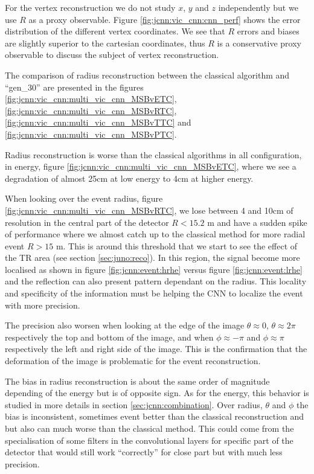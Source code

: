 For the vertex reconstruction we do not study $x$, $y$ and $z$ independently but we use $R$ as a proxy observable. Figure \ref{fig:jcnn:vic_cnn:cnn_perf} shows the error distribution of the different vertex coordinates. We see that $R$ errors and biases are slightly superior to the cartesian coordinates, thus $R$ is a conservative proxy observable to discuss the subject of vertex reconstruction.

The comparison of radius reconstruction between the classical algorithm and ``gen\_30'' are presented in the figures \ref{fig:jcnn:vic_cnn:multi_vic_cnn_MSBvETC}, \ref{fig:jcnn:vic_cnn:multi_vic_cnn_MSBvRTC}, \ref{fig:jcnn:vic_cnn:multi_vic_cnn_MSBvTTC} and \ref{fig:jcnn:vic_cnn:multi_vic_cnn_MSBvPTC}.

Radius reconstruction is worse than the classical algorithms in all configuration, in energy, figure \ref{fig:jcnn:vic_cnn:multi_vic_cnn_MSBvETC}, where we see a degradation of almost 25cm at low energy to 4cm at higher energy.

When looking over the event radius, figure \ref{fig:jcnn:vic_cnn:multi_vic_cnn_MSBvRTC}, we lose between 4 and 10cm of resolution in the central part of the detector $R < 15.2$ m and have a sudden spike of performance where we almost catch up to the classical method for more radial event $R > 15$ m. This is around this threshold that we start to see the effect of the TR area (see section \ref{sec:juno:reco}). In this region, the signal become more localised as shown in figure \ref{fig:jcnn:event:hrhe} versus figure \ref{fig:jcnn:event:lrhe} and the reflection can also present pattern dependant on the radius. This locality and specificity of the information must be helping the CNN to localize the event with more precision.

The precision also worsen when looking at the edge of the image $\theta \approx 0$, $\theta \approx 2\pi$ respectively the top and bottom of the image, and when $\phi \approx -\pi$ and $\phi \approx \pi$ respectively the left and right side of the image. This is the confirmation that the deformation of the image is problematic for the event reconstruction.

The bias in radius reconstruction is about the same order of magnitude depending of the energy but is of opposite sign. As for the energy, this behavior is studied in more details in section \ref{sec:jcnn:combination}. Over radius, $\theta$ and $\phi$ the bias is inconsistent, sometimes event better than the classical reconstruction and but also can much worse than the classical method. This could come from the specialisation of some filters in the convolutional layers for specific part of the detector that would still work ``correctly'' for close part but with much less precision.

